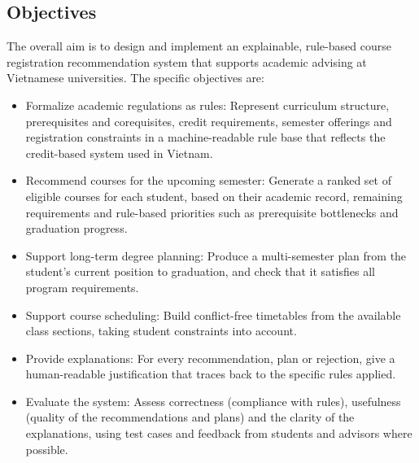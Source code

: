    \subsection{Objectives}
The overall aim is to design and implement an explainable, rule-based course registration recommendation system that supports academic advising at Vietnamese universities. The specific objectives are:
\begin{itemize}
    \item Formalize academic regulations as rules: Represent curriculum structure, prerequisites and corequisites, credit requirements, semester offerings and registration constraints in a machine-readable rule base that reflects the credit-based system used in Vietnam.

    \item Recommend courses for the upcoming semester: Generate a ranked set of eligible courses for each student, based on their academic record, remaining requirements and rule-based priorities such as prerequisite bottlenecks and graduation progress.

    \item Support long-term degree planning: Produce a multi-semester plan from the student's current position to graduation, and check that it satisfies all program requirements.
    
    \item Support course scheduling: Build conflict-free timetables from the available class sections, taking student constraints into account.

    \item Provide explanations: For every recommendation, plan or rejection, give a human-readable justification that traces back to the specific rules applied.

    \item Evaluate the system: Assess correctness (compliance with rules), usefulness (quality of the recommendations and plans) and the clarity of the explanations, using test cases and feedback from students and advisors where possible.
\end{itemize}


